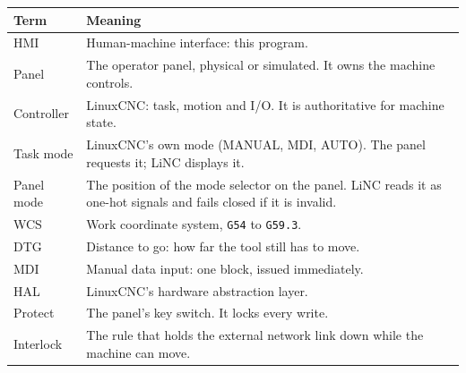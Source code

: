 \begin{longtable}{L{3.4cm}L{9.6cm}}
  \toprule
  \textbf{Term} & \textbf{Meaning} \\
  \midrule
  \endhead
  HMI & Human-machine interface: this program. \\
  Panel & The operator panel, physical or simulated. It owns the machine controls. \\
  Controller & LinuxCNC: task, motion and I/O. It is authoritative for machine state. \\
  Task mode & LinuxCNC's own mode (MANUAL, MDI, AUTO). The panel requests it; LiNC
              displays it. \\
  Panel mode & The position of the mode selector on the panel. LiNC reads it as one-hot
              signals and fails closed if it is invalid. \\
  WCS & Work coordinate system, \texttt{G54} to \texttt{G59.3}. \\
  DTG & Distance to go: how far the tool still has to move. \\
  MDI & Manual data input: one block, issued immediately. \\
  HAL & LinuxCNC's hardware abstraction layer. \\
  Protect & The panel's  key switch. It locks every write. \\
  Interlock & The rule that holds the external network link down while the machine can
              move. \\
  \bottomrule
\end{longtable}
